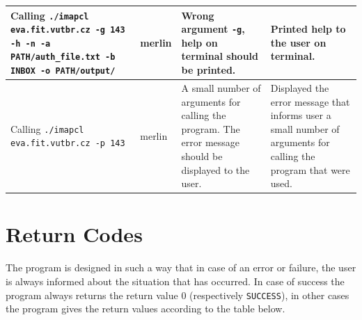\documentclass[a4paper,11pt]{article}
\begin{document}
\begin{center}
\begin{tabularx}{\textwidth}{|>{\raggedright\arraybackslash}p{5cm}|>{\raggedright\arraybackslash}p{1cm}|>{\raggedright\arraybackslash}p{5cm}|>{\raggedright\arraybackslash}X|}
        Calling \texttt{./imapcl eva.fit.vutbr.cz -g 143 -h -n -a PATH/auth\_file.txt -b INBOX -o PATH/output/} & merlin & Wrong argument \texttt{-g}, help on terminal should be printed. & Printed help to the user on terminal. \\
        \hline
        Calling \texttt{./imapcl eva.fit.vutbr.cz -p 143} & merlin & A small number of arguments for calling the program. The error message should be displayed to the user. & Displayed the error message that informs user a small number of arguments for calling the program that were used.\\
        \hline
    \end{tabularx}
    \vspace{0.5cm} %
\end{center}

\newpage

\section{Return Codes}
The program is designed in such a way that in case of an error or failure, the user 
is always informed about the situation that has occurred. In case of success the program 
always returns the return value 0 (respectively \verb!SUCCESS!), in other cases the program gives the return 
values according to the table below.
\end{document}
